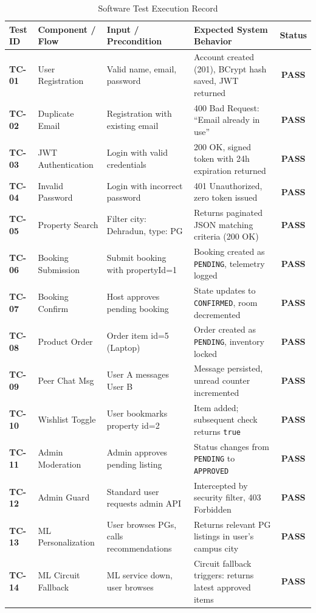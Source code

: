 \begin{table}[htbp]
\centering
\caption{Software Test Execution Record}
\label{tab:test_execution_matrix}
\footnotesize
\begin{tabularx}{\textwidth}{lp{3.2cm}p{4.0cm}p{3.2cm}c}
\toprule
\textbf{Test ID} & \textbf{Component / Flow} & \textbf{Input / Precondition} & \textbf{Expected System Behavior} & \textbf{Status} \\
\midrule
\textbf{TC-01} & User Registration & Valid name, email, password & Account created (201), BCrypt hash saved, JWT returned & \textbf{PASS} \\
\textbf{TC-02} & Duplicate Email & Registration with existing email & 400 Bad Request: ``Email already in use'' & \textbf{PASS} \\
\textbf{TC-03} & JWT Authentication & Login with valid credentials & 200 OK, signed token with 24h expiration returned & \textbf{PASS} \\
\textbf{TC-04} & Invalid Password & Login with incorrect password & 401 Unauthorized, zero token issued & \textbf{PASS} \\
\textbf{TC-05} & Property Search & Filter city: Dehradun, type: PG & Returns paginated JSON matching criteria (200 OK) & \textbf{PASS} \\
\textbf{TC-06} & Booking Submission & Submit booking with propertyId=1 & Booking created as \texttt{PENDING}, telemetry logged & \textbf{PASS} \\
\textbf{TC-07} & Booking Confirm & Host approves pending booking & State updates to \texttt{CONFIRMED}, room decremented & \textbf{PASS} \\
\textbf{TC-08} & Product Order & Order item id=5 (Laptop) & Order created as \texttt{PENDING}, inventory locked & \textbf{PASS} \\
\textbf{TC-09} & Peer Chat Msg & User A messages User B & Message persisted, unread counter incremented & \textbf{PASS} \\
\textbf{TC-10} & Wishlist Toggle & User bookmarks property id=2 & Item added; subsequent check returns \texttt{true} & \textbf{PASS} \\
\textbf{TC-11} & Admin Moderation & Admin approves pending listing & Status changes from \texttt{PENDING} to \texttt{APPROVED} & \textbf{PASS} \\
\textbf{TC-12} & Admin Guard & Standard user requests admin API & Intercepted by security filter, 403 Forbidden & \textbf{PASS} \\
\textbf{TC-13} & ML Personalization & User browses PGs, calls recommendations & Returns relevant PG listings in user's campus city & \textbf{PASS} \\
\textbf{TC-14} & ML Circuit Fallback& ML service down, user browses & Circuit fallback triggers: returns latest approved items & \textbf{PASS} \\
\bottomrule
\end{tabularx}
\end{table}

